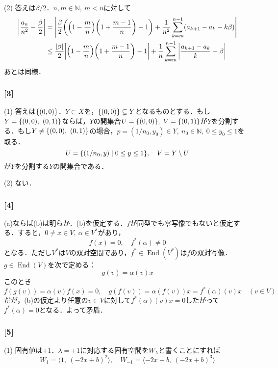 \documentclass[a4j]{ltjsarticle}
\newcommand{\Nset}{\mathbb{N}}
\newcommand{\1}{\mathbbm{1}}
\numberwithin{equation}{section}
\theoremstyle{definition}
\begin{document}
(2) 答えは$\beta/2$．$n,m\in\Nset,\ m<n$に対して
\begin{align}
    \abs{\frac{a_n}{n^2}-\frac{\beta}{2}}
    &=\abs{\frac{\beta}{2}\qty(\qty(1-\frac{m}{n})\qty(1+\frac{m-1}{n})-1)+\frac{1}{n^2}\sum_{k=m}^{n-1}(a_{k+1}-a_{k}-k\beta)}\\
    &\leq \frac{\abs{\beta}}{2}\abs{\qty(1-\frac{m}{n})\qty(1+\frac{m-1}{n})-1}+\frac{1}{n}\sum_{k=m}^{n-1}\abs{\frac{a_{k+1}-a_{k}}{k}-\beta} 
\end{align}
あとは同様．

\subsubsection*{[3]}
(1) 答えは$\qty{(0,0)}$．$Y\subset X$を，$\qty{(0,0)}\subsetneq Y$となるものとする．もし$Y=\qty{(0,0),\ (0,1)}$ならば，$Y$の開集合$U=\qty{(0,0)},\ V=\qty{(0,1)}$が$Y$を分割する．もし$Y\neq \qty{(0,0),\ (0,1)}$の場合，$p=(1/n_0,y_0)\in Y,\ n_0\in\Nset,\ 0\leq y_0\leq 1$を取る．
\begin{equation}
    U=\qty{(1/n_0,y)\mid 0\leq y\leq 1},\quad V=Y\setminus U 
\end{equation}
が$Y$を分割する$Y$の開集合である．

(2) ない．

\subsubsection*{[4]}
(a)ならば(b)は明らか．(b)を仮定する．$f$が同型でも零写像でもないと仮定する．すると，$0\neq x\in V,\ \alpha\in V^\ast$があり，
\begin{equation}
    f(x)=0,\quad f^\ast(\alpha)\neq0 
\end{equation}
となる．ただし$V^\ast$は$V$の双対空間であり，$f^\ast\in \mathop{\mathrm{End}}(V^\ast)$は$f$の双対写像．$g\in \mathop{\mathrm{End}}(V)$を次で定める：
\begin{equation}
    g(v)=\alpha(v)x
\end{equation}
このとき
\begin{equation}
    f(g(v))=\alpha(v)f(x)=0,\quad g(f(v))=\alpha(f(v))x=f^\ast(\alpha)(v)x\quad (v\in V)
\end{equation}
だが，(b)の仮定より任意の$v\in V$に対して$f^\ast(\alpha)(v)x=0$したがって$f^\ast(\alpha)=0$となる．よって矛盾．
\subsubsection*{[5]}
(1) 固有値は$\pm 1$．$\lambda=\pm1$に対応する固有空間を$W_{\lambda}$と書くことにすれば
\begin{equation}
    W_{1}=\langle1,\ (-2x+b)^2\rangle ,\quad W_{-1}=\langle-2x+b,\ (-2x+b)^3\rangle
\end{equation}
\end{document}
